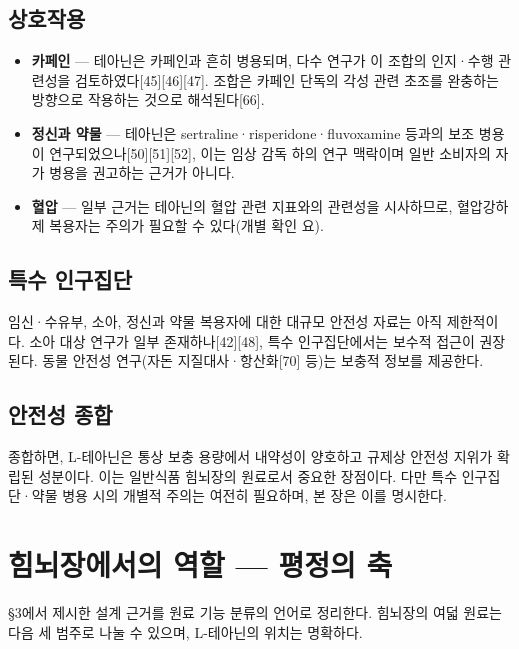 \documentclass[11pt,oneside]{book}
\begin{document}
\subsection{상호작용}
\begin{itemize}[leftmargin=6mm,itemsep=1pt,topsep=2pt]
  \item \textbf{카페인} — 테아닌은 카페인과 흔히 병용되며, 다수 연구가 이 조합의 인지·수행 관련성을 검토하였다[45][46][47]. 조합은 카페인 단독의 각성 관련 초조를 완충하는 방향으로 작용하는 것으로 해석된다[66].
  \item \textbf{정신과 약물} — 테아닌은 sertraline·risperidone·fluvoxamine 등과의 보조 병용이 연구되었으나[50][51][52], 이는 임상 감독 하의 연구 맥락이며 일반 소비자의 자가 병용을 권고하는 근거가 아니다.
  \item \textbf{혈압} — 일부 근거는 테아닌의 혈압 관련 지표와의 관련성을 시사하므로, 혈압강하제 복용자는 주의가 필요할 수 있다(개별 확인 요).
\end{itemize}
\subsection{특수 인구집단}
임신·수유부, 소아, 정신과 약물 복용자에 대한 대규모 안전성 자료는 아직 제한적이다. 소아 대상 연구가 일부 존재하나[42][48], 특수 인구집단에서는 보수적 접근이 권장된다. 동물 안전성 연구(자돈 지질대사·항산화[70] 등)는 보충적 정보를 제공한다.

\subsection{안전성 종합}
종합하면, L-테아닌은 통상 보충 용량에서 내약성이 양호하고 규제상 안전성 지위가 확립된 성분이다. 이는 일반식품 힘뇌장의 원료로서 중요한 장점이다. 다만 특수 인구집단·약물 병용 시의 개별적 주의는 여전히 필요하며, 본 장은 이를 명시한다.

\section{힘뇌장에서의 역할 — 평정의 축}
§3에서 제시한 설계 근거를 원료 기능 분류의 언어로 정리한다. 힘뇌장의 여덟 원료는 다음 세 범주로 나눌 수 있으며, L-테아닌의 위치는 명확하다.

\vspace{2pt}\vspace{3pt}
\end{document}
